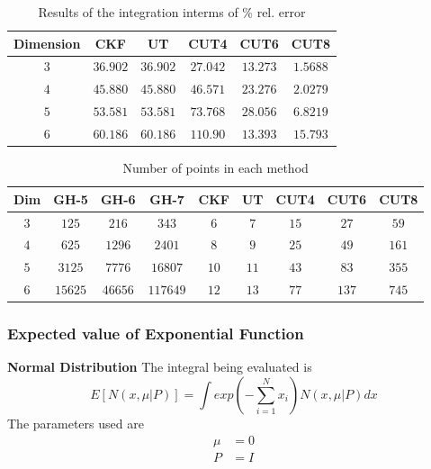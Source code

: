 \documentclass[11pt]{beamer}
\begin{document}
\begin{frame}
\begin{table}
\caption{Results of the integration interms of \% rel. error }
\label{optsoln12}
\begin{center}

\begin{tabular}{|c||c|c|c|c|c|}
\hline
Dimension & CKF & UT & CUT4 & CUT6 & CUT8 \\
\hline
$3$ & $36.902 $  &  $36.902$ & $27.042$ & $13.273$ & $1.5688$  \\
\hline
$4$ & $45.880 $  &  $45.880 $ &  $46.571$ &  $23.276 $ & $2.0279$\\
\hline
$5$ & $53.581 $  &  $53.581 $ &  $73.768$ & $28.056 $ & $6.8219$\\
\hline
$6$ & $60.186$  &  $60.186 $ & $110.90$ & $13.393$ & $15.793$\\
\hline
\end{tabular}
\end{center}
\end{table}

\begin{table}
\caption{Number of points in each method }
\label{optsoln12}
\begin{center}
\small
\begin{tabular}{|c||c|c|c|c|c|c|c|c|}
\hline
Dim & GH-5     &  GH-6     &  GH-7      & CKF   & UT    & CUT4  & CUT6  & CUT8 \\
\hline
$3$       & $125 $   &  $216$    &  $343$    & $6$   & $7$   & $15$   & $27$   & $59$\\
\hline
$4$       & $625 $  &  $1296$   &  $2401$   & $8$   & $9$   & $25$   & $49$   & $161$\\
\hline
$5$       & $3125  $  &  $7776 $ &  $ 16807$   & $10$  & $11$  & $43$   & $83$   & $355$\\
\hline
$6$       & $15625$   &  $46656$  &  $117649$  & $12$  & $13$  & $77$   & $137$   & $745$\\
\hline
\end{tabular}
\end{center}
\end{table}
\end{frame}
\begin{frame}
\frametitle{Expected value of Exponential Function}
{\bf Normal Distribution}
The integral being evaluated is 
\begin{equation*}
E[N(x,\mu|P)]=\int{exp(-\sum_{i=1}^N{x_i})N(x,\mu|P)}dx
\end{equation*}
 The parameters used are
\begin{align*}
\mu&=0\\
P&=I
\end{align*}
\end{frame}
\end{document}
